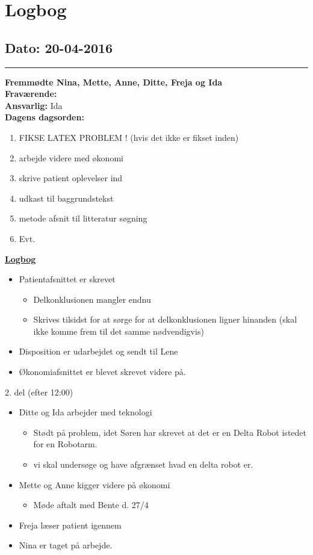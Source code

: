 \chapter{Logbog}
\section{Dato: 20-04-2016}
\hrule
\textbf{Fremmødte Nina, Mette, Anne, Ditte, Freja og Ida } \\
\textbf{Fraværende: } \\
\textbf{Ansvarlig:} Ida  \\
\textbf{Dagens dagsorden: }
\begin{enumerate}
	\item FIKSE LATEX PROBLEM ! (hvis det ikke er fikset inden)
	\item arbejde videre med økonomi
	\item skrive patient oplevelser ind
	\item udkast til baggrundstekst
	\item metode afsnit til litteratur søgning
	\item Evt. 
\end{enumerate}

\underline{\textbf{Logbog}}
\begin{itemize}
\item Patientafsnittet er skrevet
\begin{itemize}
\item Delkonklusionen mangler endnu 
\item Skrives tilsidst for at sørge for at delkonklusionen ligner hinanden (skal ikke komme frem til det samme nødvendigvis)
\end{itemize}
\item Disposition er udarbejdet og sendt til Lene
\item Økonomiafsnittet er blevet skrevet videre på.
\end{itemize}
2. del (efter 12:00)
\begin{itemize}
\item Ditte og Ida arbejder med teknologi
\begin{itemize}
\item Stødt på problem, idet Søren har skrevet at det er en Delta Robot istedet for en Robotarm.
\item vi skal undersøge og have afgrænset hvad en delta robot er.
\end{itemize}
\item Mette og Anne kigger videre på økonomi
\begin{itemize}
\item Møde aftalt med Bente d. 27/4
\end{itemize}
\item Freja læser patient igennem
\item Nina er taget på arbejde.
\end{itemize}
\newpage